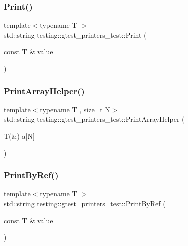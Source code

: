 \subsubsection{\texorpdfstring{Print()}{Print()}}
{\footnotesize\ttfamily template$<$typename T $>$ \\
std\+::string testing\+::gtest\+\_\+printers\+\_\+test\+::\+Print (\begin{DoxyParamCaption}\item[{const T \&}]{value }\end{DoxyParamCaption})}

\mbox{\label{namespacetesting_1_1gtest__printers__test_a694f23c5a8c134f0e6e24a412f8d75c1}} 
\subsubsection{\texorpdfstring{PrintArrayHelper()}{PrintArrayHelper()}}
{\footnotesize\ttfamily template$<$typename T , size\+\_\+t N$>$ \\
std\+::string testing\+::gtest\+\_\+printers\+\_\+test\+::\+Print\+Array\+Helper (\begin{DoxyParamCaption}\item[{T(\&)}]{a\mbox{[}\+N\mbox{]} }\end{DoxyParamCaption})}

\mbox{\label{namespacetesting_1_1gtest__printers__test_a680e1fd7cfbae100466abe89567a0ee9}} 
\subsubsection{\texorpdfstring{PrintByRef()}{PrintByRef()}}
{\footnotesize\ttfamily template$<$typename T $>$ \\
std\+::string testing\+::gtest\+\_\+printers\+\_\+test\+::\+Print\+By\+Ref (\begin{DoxyParamCaption}\item[{const T \&}]{value }\end{DoxyParamCaption})}

